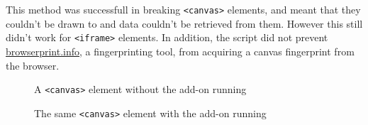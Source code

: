 This method was successfull in breaking \texttt{<canvas>} elements, and meant that they couldn't be drawn to and data couldn't be retrieved from them.
However this still didn't work for \texttt{<iframe>} elements.
In addition, the script did not prevent \url{browserprint.info}, a fingerprinting tool, from acquiring a canvas fingerprint from the browser.

\begin{figure}[!tbp]
    \centering
    \begin{minipage}[b]{0.4\textwidth}
        \caption{A \texttt{<canvas>} element without the add-on running}
        \label{fig:hello-world-canvas}
    \end{minipage}
    \hfill
    \begin{minipage}[b]{0.4\textwidth}
        \caption{The same \texttt{<canvas>} element with the add-on running}
        \label{fig:blank-canvas}
    \end{minipage}
\end{figure}


